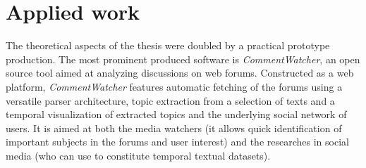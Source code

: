 \documentclass{article}
\begin{document}
\section*{Applied work}

The theoretical aspects of the thesis were doubled by a practical prototype production.
The most prominent produced software is \textit{CommentWatcher}, an open source tool aimed at analyzing discussions on web forums.
Constructed as a web platform, \textit{CommentWatcher} features automatic fetching of the forums using a versatile parser architecture, topic extraction from a selection of texts and  a temporal visualization of extracted topics and the underlying social network of users.
It is aimed at both the media watchers 
(it allows quick identification of important subjects in the forums and user interest)
and the researches in social media (who can use to constitute temporal textual datasets).



\end{document}
